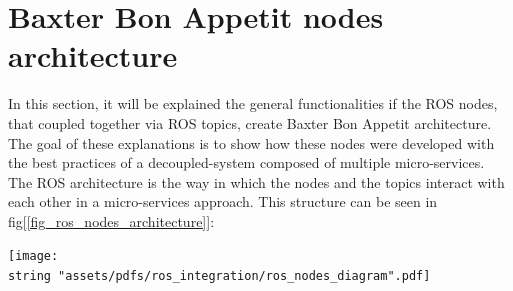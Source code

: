 \documentclass[11pt]{report} %
\begin{document}
\section{Baxter Bon Appetit nodes architecture}

In this section, it will be explained the general functionalities if the ROS nodes, that coupled together via ROS topics, create Baxter Bon Appetit architecture. The goal of these explanations is to show how these nodes were developed with the best practices of a decoupled-system composed of multiple micro-services. \\

The ROS architecture is the way in which the nodes and the topics interact with each other in a micro-services approach. This structure can be seen in fig[\ref{fig_ros_nodes_architecture}]:

\begin{center}
\texttt{[image: \\string "assets/pdfs/ros\_integration/ros\_nodes\_diagram".pdf]}
\bigbreak
\begin{minipage}{\linewidth} %
\label{fig_ros_nodes_architecture}
\end{minipage} \end{center}
\end{document}
